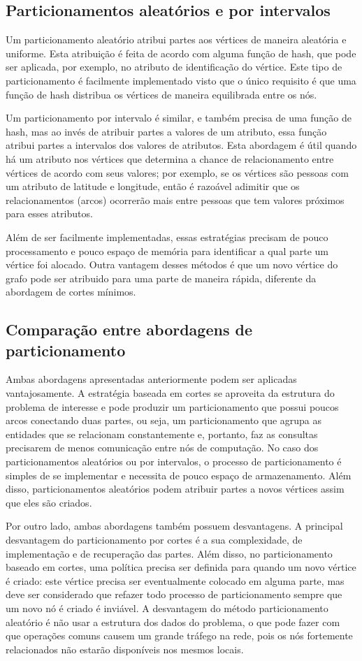 \documentclass[conference]{IEEEtran}
\begin{document}
\subsection{Particionamentos aleatórios e por intervalos}
Um particionamento aleatório atribui partes aos vértices de maneira
aleatória e uniforme. Esta atribuição é feita de acordo com alguma
função de hash, que pode ser aplicada, por exemplo, no atributo
de identificação do vértice. Este tipo de particionamento é facilmente
implementado visto que o único requisito é que uma função de hash
distribua os vértices de maneira equilibrada entre os nós.

Um particionamento por intervalo é similar, e também precisa de uma
função de hash, mas ao invés de atribuir partes a valores de um
atributo, essa função atribui partes a intervalos dos valores de
atributos. Esta abordagem é útil quando há um atributo nos vértices que
determina a chance de relacionamento entre vértices de acordo com
seus valores; por exemplo, se os vértices são pessoas com um atributo
de latitude e longitude, então é razoável adimitir que os
relacionamentos (arcos) ocorrerão mais entre pessoas que tem valores
próximos para esses atributos.

Além de ser facilmente implementadas, essas estratégias precisam de
pouco processamento e pouco espaço de memória para identificar a qual
parte um vértice foi alocado. Outra vantagem desses métodos é que um
novo vértice do grafo pode ser atribuido para uma parte de maneira
rápida, diferente da abordagem de cortes mínimos.

\subsection{Comparação entre abordagens de particionamento}
Ambas abordagens apresentadas anteriormente podem ser aplicadas
vantajosamente. A estratégia baseada em cortes se aproveita da estrutura
do problema de interesse e pode produzir um particionamento
que possui poucos arcos conectando duas partes, ou seja, um
particionamento que agrupa as entidades que se relacionam constantemente
e, portanto, faz as consultas precisarem de menos comunicação entre
nós de computação. No caso dos particionamentos aleatórios ou por
intervalos, o processo de particionamento é simples de se implementar
e necessita de pouco espaço de armazenamento. Além disso,
particionamentos aleatórios podem atribuir partes a novos vértices assim
que eles são criados.

Por outro lado, ambas abordagens também possuem desvantagens. A
principal desvantagem do particionamento por cortes é a sua
complexidade, de implementação e de recuperação das partes. Além disso,
no particionamento baseado em cortes, uma política precisa ser definida
para quando um novo vértice é criado: este vértice precisa ser
eventualmente colocado em alguma parte, mas deve ser considerado que
refazer todo processo de particionamento sempre que um novo nó é criado
é inviável. A desvantagem do método particionamento aleatório é não
usar a estrutura dos dados do problema, o que pode fazer com que
operações comuns causem um grande tráfego na rede, pois os nós
fortemente relacionados não estarão disponíveis nos mesmos locais.
\end{document}
